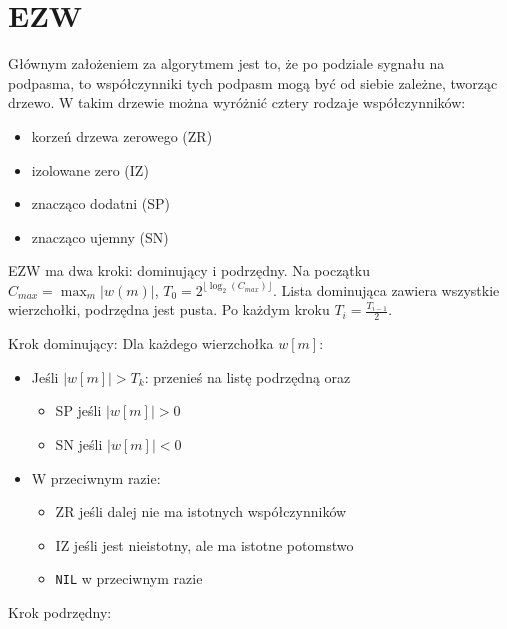 \documentclass{../notatki}
\begin{document}
\section{EZW}

Głównym założeniem za algorytmem jest to, że po podziale sygnału na
podpasma, to współczynniki tych podpasm mogą być od siebie zależne, tworząc
drzewo. W takim drzewie można wyróżnić cztery rodzaje współczynników:
\begin{itemize}
\item korzeń drzewa zerowego (ZR)
\item izolowane zero (IZ)
\item znacząco dodatni (SP)
\item znacząco ujemny (SN)
\end{itemize}

EZW ma dwa kroki: dominujący i podrzędny. Na początku $C_{max} = \max_m |w(m)|$,
$T_0 = 2^{\lfloor \log_2(C_{max})\rfloor}$. Lista dominująca zawiera wszystkie
wierzchołki, podrzędna jest pusta. Po każdym kroku $T_i = \frac{T_{i-1}}{2}$.

Krok dominujący: Dla każdego wierzchołka $w[m]$:
\begin{itemize}
\item Jeśli $|w[m]| > T_k$:
przenieś na listę podrzędną oraz
\begin{itemize}
\item SP jeśli $|w[m]| > 0$
\item SN jeśli $|w[m]| < 0$
\end{itemize}
\item W przeciwnym razie:
\begin{itemize}
\item ZR jeśli dalej nie ma istotnych współczynników
\item IZ jeśli jest nieistotny, ale ma istotne potomstwo
\item \texttt{NIL} w przeciwnym razie
\end{itemize}
\end{itemize}

Krok podrzędny:
\end{document}
